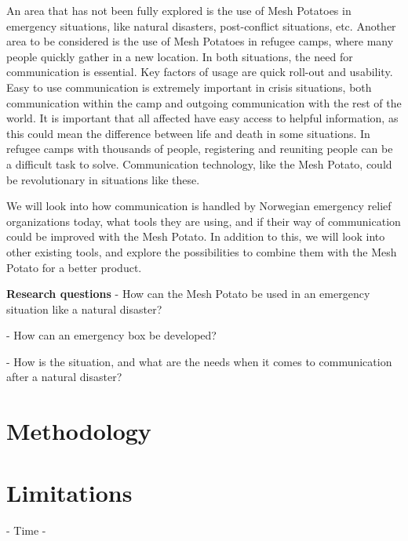 An area that has not been fully explored is the use of Mesh Potatoes in emergency situations, like natural disasters, post-conflict situations, etc. Another area to be considered is the use of Mesh Potatoes in refugee camps, where many people quickly gather in a new location. In both situations, the need for communication is essential. Key factors of usage are quick roll-out and usability. Easy to use communication is extremely important in crisis situations, both communication within the camp and outgoing communication with the rest of the world. It is important that all affected have easy access to helpful information, as this could mean the difference between life and death in some situations. In refugee camps with thousands of people, registering and reuniting people can be a difficult task to solve. Communication technology, like the Mesh Potato, could be revolutionary in situations like these. 

We will look into how communication is handled by Norwegian emergency relief organizations today, what tools they are using, and if their way of communication could be improved with the Mesh Potato. In addition to this, we will look into other existing tools, and explore the possibilities to combine them with the Mesh Potato for a better product. 

\textbf{Research questions}
- How can the Mesh Potato be used in an emergency situation like a natural disaster?

- How can an emergency box be developed?

- How is the situation, and what are the needs when it comes to communication after a natural disaster?



\section{Methodology}

\section{Limitations}
- Time
- 